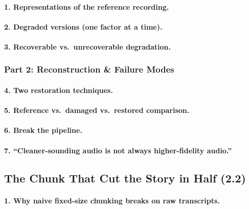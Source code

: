 \documentclass[11pt]{article}
\begin{document}
\paragraph{1. Representations of the reference recording.}
%

\paragraph{2. Degraded versions (one factor at a time).}
%

\paragraph{3. Recoverable vs.\ unrecoverable degradation.}
%

\subsubsection*{Part 2: Reconstruction \& Failure Modes}

\paragraph{4. Two restoration techniques.}
%

\paragraph{5. Reference vs.\ damaged vs.\ restored comparison.}
%

\paragraph{6. Break the pipeline.}
%

\paragraph{7. ``Cleaner-sounding audio is not always higher-fidelity audio.''}
%

\subsection{The Chunk That Cut the Story in Half (2.2)}

\paragraph{1. Why naive fixed-size chunking breaks on raw transcripts.}
%
\end{document}
